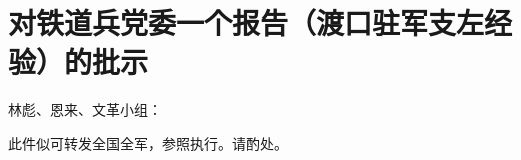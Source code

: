 \section[对铁道兵党委一个报告（渡口驻军支左经验）的批示（一九六七年三月七日）]{对铁道兵党委一个报告（渡口驻军支左经验）的批示}


\noindent 林彪、恩来、文革小组：

此件似可转发全国全军，参照执行。请酌处。


